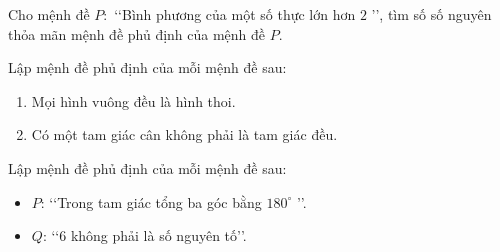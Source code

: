 \begin{bt}%
	Cho mệnh đề $P\colon$ \lq\lq Bình phương của một số thực lớn hơn $ 2 $ \rq\rq, tìm số số  nguyên thỏa mãn mệnh đề phủ định của mệnh đề $P$.
\end{bt}



\begin{bt}%
	Lập mệnh  đề phủ định của mỗi mệnh đề sau:
	\begin{enumerate}
		\item Mọi hình vuông đều là hình thoi. 
		\item Có một tam giác cân không phải là tam  giác đều.
	\end{enumerate}
\end{bt}

\begin{bt}%
	Lập  mệnh đề phủ định của mỗi mệnh đề sau:
	\begin{itemize}
		\item  $P$: \lq\lq Trong tam giác tổng ba góc bằng $180^{\circ}$ \rq\rq.
		\item $Q$:  \lq\lq $6$ không phải là số nguyên tố\rq\rq.
	\end{itemize}
\end{bt}

